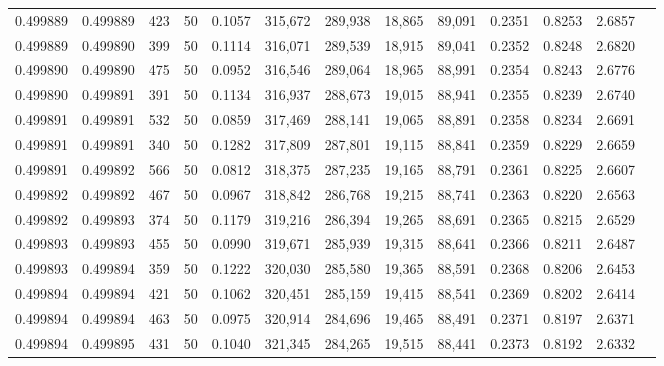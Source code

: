 \begin{tabular}{rrrrrrrrrrrrr}
0.499889 & 0.499889 &   423 &  50 &                                     0.1057 & 315,672 & 289,938 &  18,865 &  89,091 & 0.2351 & 0.8253 & 2.6857 \\
0.499889 & 0.499890 &   399 &  50 &                                     0.1114 & 316,071 & 289,539 &  18,915 &  89,041 & 0.2352 & 0.8248 & 2.6820 \\
0.499890 & 0.499890 &   475 &  50 &                                     0.0952 & 316,546 & 289,064 &  18,965 &  88,991 & 0.2354 & 0.8243 & 2.6776 \\
0.499890 & 0.499891 &   391 &  50 &                                     0.1134 & 316,937 & 288,673 &  19,015 &  88,941 & 0.2355 & 0.8239 & 2.6740 \\
0.499891 & 0.499891 &   532 &  50 &                                     0.0859 & 317,469 & 288,141 &  19,065 &  88,891 & 0.2358 & 0.8234 & 2.6691 \\
0.499891 & 0.499891 &   340 &  50 &                                     0.1282 & 317,809 & 287,801 &  19,115 &  88,841 & 0.2359 & 0.8229 & 2.6659 \\
0.499891 & 0.499892 &   566 &  50 &                                     0.0812 & 318,375 & 287,235 &  19,165 &  88,791 & 0.2361 & 0.8225 & 2.6607 \\
0.499892 & 0.499892 &   467 &  50 &                                     0.0967 & 318,842 & 286,768 &  19,215 &  88,741 & 0.2363 & 0.8220 & 2.6563 \\
0.499892 & 0.499893 &   374 &  50 &                                     0.1179 & 319,216 & 286,394 &  19,265 &  88,691 & 0.2365 & 0.8215 & 2.6529 \\
0.499893 & 0.499893 &   455 &  50 &                                     0.0990 & 319,671 & 285,939 &  19,315 &  88,641 & 0.2366 & 0.8211 & 2.6487 \\
0.499893 & 0.499894 &   359 &  50 &                                     0.1222 & 320,030 & 285,580 &  19,365 &  88,591 & 0.2368 & 0.8206 & 2.6453 \\
0.499894 & 0.499894 &   421 &  50 &                                     0.1062 & 320,451 & 285,159 &  19,415 &  88,541 & 0.2369 & 0.8202 & 2.6414 \\
0.499894 & 0.499894 &   463 &  50 &                                     0.0975 & 320,914 & 284,696 &  19,465 &  88,491 & 0.2371 & 0.8197 & 2.6371 \\
0.499894 & 0.499895 &   431 &  50 &                                     0.1040 & 321,345 & 284,265 &  19,515 &  88,441 & 0.2373 & 0.8192 & 2.6332 \\

\end{tabular}
